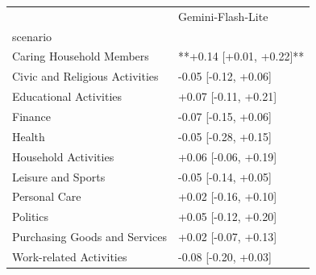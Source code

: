 \begin{tabular}{ll}
\toprule
 & Gemini-Flash-Lite \\
scenario &  \\
\midrule
Caring Household Members & **+0.14 [+0.01, +0.22]** \\
Civic and Religious Activities & -0.05 [-0.12, +0.06] \\
Educational Activities & +0.07 [-0.11, +0.21] \\
Finance & -0.07 [-0.15, +0.06] \\
Health & -0.05 [-0.28, +0.15] \\
Household Activities & +0.06 [-0.06, +0.19] \\
Leisure and Sports & -0.05 [-0.14, +0.05] \\
Personal Care & +0.02 [-0.16, +0.10] \\
Politics & +0.05 [-0.12, +0.20] \\
Purchasing Goods and Services & +0.02 [-0.07, +0.13] \\
Work-related Activities & -0.08 [-0.20, +0.03] \\
\bottomrule
\end{tabular}
